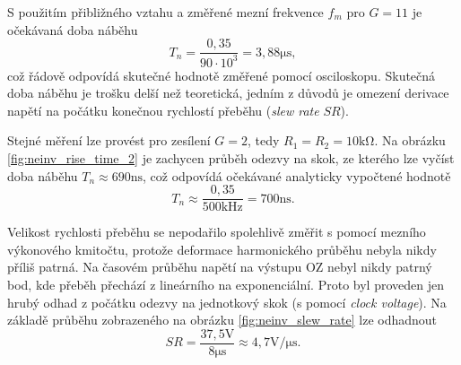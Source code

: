 \documentclass[twoside]{article}
\begin{document}
S použitím přibližného vztahu a změřené mezní frekvence $f_m$ pro $G = 11$ je očekávaná doba náběhu
\begin{equation}
    T_n = \frac{0,35}{90 \cdot 10^3} = 3,88 \si{\micro\second},
\end{equation}
což řádově odpovídá skutečné hodnotě změřené pomocí osciloskopu. Skutečná doba náběhu je trošku delší než teoretická,
jedním z důvodů je omezení derivace napětí na počátku konečnou rychlostí přeběhu (\textit{slew rate} $SR$).

Stejné měření lze provést pro zesílení $G = 2$, tedy $R_1 = R_2 = 10 \si{\kilo\ohm}$.
Na obrázku \ref{fig:neinv_rise_time_2} je zachycen průběh odezvy na skok, ze kterého lze
vyčíst doba náběhu $T_n \approx 690 \si{\nano\second}$, což odpovídá očekávané analyticky vypočtené hodnotě
\begin{equation}
    T_n \approx \frac{0,35}{500 \si{\kilo\hertz}} = 700 \si{\nano\second}.
\end{equation}

Velikost rychlosti přeběhu se nepodařilo spolehlivě změřit s pomocí mezního výkonového kmitočtu,
protože deformace harmonického průběhu nebyla nikdy příliš patrná.
Na časovém průběhu napětí na výstupu OZ nebyl nikdy patrný bod, kde přeběh přechází z lineárního na exponenciální.
Proto byl proveden jen hrubý odhad z počátku odezvy na jednotkový skok (s pomocí \textit{clock voltage}).
Na základě průběhu zobrazeného na obrázku \ref{fig:neinv_slew_rate} lze odhadnout
\begin{equation}
    SR = \frac{37,5 \si{\volt}}{8 \si{\micro\second}}  \approx 4,7 \si{\volt\per\micro\second}.
\end{equation}
\end{document}
